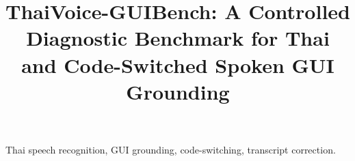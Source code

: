 \documentclass[conference,letterpaper]{IEEEtran}
\title{ThaiVoice-GUIBench: A Controlled Diagnostic Benchmark for Thai and Code-Switched Spoken GUI Grounding}
\author{\IEEEauthorblockN{Paphanin Amnuaikitwanit, Thepchai Supnithi, and Nongnuch Ketui}}
\begin{document}
\maketitle

\begin{IEEEkeywords}
Thai speech recognition, GUI grounding, code-switching, transcript correction.
\end{IEEEkeywords}










\end{document}
